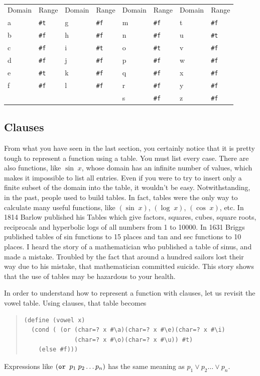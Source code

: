 \documentclass[a4paper,12pt]{book}
\begin{document}
\verb||\\
{\footnotesize
\begin{tabular}{|p{1.2cm} p{1.2cm} | p{1.2cm} p{1.2cm} |p{1.2cm} p{1.2cm} | p{1.2cm} p{1.2cm} |}
Domain & Range & Domain & Range & Domain & Range & Domain & Range\\
a & \verb|#t| & g &\verb|#f| & m &\verb|#f| & t & \verb|#f| \\
b & \verb|#f| & h &\verb|#f| & n & \verb|#f| & u & \verb|#t| \\
c & \verb|#f| &  i &\verb|#t| &o &\verb|#t| & v & \verb|#f|\\
d &\verb|#f| &  j & \verb|#f| & p & \verb|#f| & w & \verb|#f| \\
e &\verb|#t| & k & \verb|#f| & q & \verb|#f| & x & \verb|#f| \\
f &\verb|#f| &  l &\verb|#f| & r & \verb|#f| & y & \verb|#f| \\
&            &                 &  & s & \verb|#f| & z & \verb|#f|\\
\end{tabular}}

\subsection{Clauses}
From what you have seen in the last section, you certainly notice that it is pretty tough to represent a
function using a table. You must list every case. There are also functions,
like $\sin\;x$, whose domain has an infinite number of values, which makes
it impossible to list all entries. 
Even if you were to try to insert only a finite
subset of the domain into the table, it wouldn't be easy. 
Notwithstanding, in the past,
people used to build tables. In fact, tables were the only way to calculate many
useful functions, like $(\sin\;x)$, 
$(\log\;x)$, $(\cos\;x)$, etc. In 1814 Barlow
published his Tables which give factors, squares, cubes, square roots, reciprocals
and hyperbolic logs of all numbers from 1 to 10000. In 1631 Briggs published
tables of sin functions to 15 places and tan and sec functions to 10 places.
I heard the story of a mathematician who published a table of sinus, and made
a mistake. Troubled by the fact that around a hundred sailors lost their way due to his
mistake, that mathematician committed suicide. This story shows that the use
of tables may be hazardous to your health.

In order to understand how to represent a function with clauses, let us revisit the vowel table.
Using clauses, that table becomes
\begin{quote}\small
\begin{verbatim}
(define (vowel x)
  (cond ( (or (char=? x #\a)(char=? x #\e)(char=? x #\i) 
              (char=? x #\o)(char=? x #\u)) #t)
    (else #f)))
\end{verbatim}
\end{quote}
Expressions like $(\verb|or | p_1\;p_2\ldots p_n)$ has the same 
meaning as $p_1 \vee p_2\ldots \vee p_n$.
\end{document}
